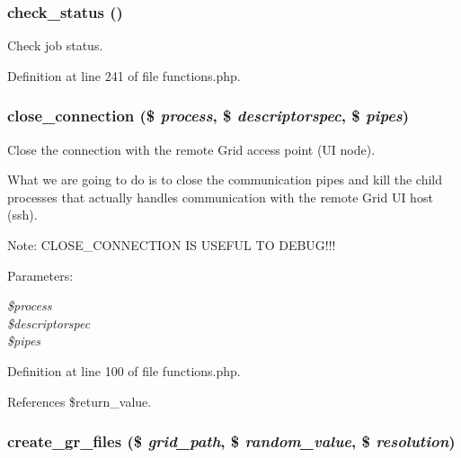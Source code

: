 \subsubsection{\setlength{\rightskip}{0pt plus 5cm}check\_\-status ()}\label{functions_8php_a6}


Check job status. 



Definition at line 241 of file functions.php.
\subsubsection{\setlength{\rightskip}{0pt plus 5cm}close\_\-connection (\$ {\em process}, \$ {\em descriptorspec}, \$ {\em pipes})}\label{functions_8php_a1}


Close the connection with the remote Grid access point (UI node). 

What we are going to do is to close the communication pipes and kill the child processes that actually handles communication with the remote Grid UI host (ssh).

\begin{Desc}
\item[Note:]CLOSE\_\-CONNECTION IS USEFUL TO DEBUG!!!\end{Desc}
\begin{Desc}
\item[Parameters:]
\begin{description}
\item[{\em \$process}]\item[{\em \$descriptorspec}]\item[{\em \$pipes}]\end{description}
\end{Desc}


Definition at line 100 of file functions.php.

References \$return\_\-value.
\subsubsection{\setlength{\rightskip}{0pt plus 5cm}create\_\-gr\_\-files (\$ {\em grid\_\-path}, \$ {\em random\_\-value}, \$ {\em resolution})}\label{functions_8php_a8}


